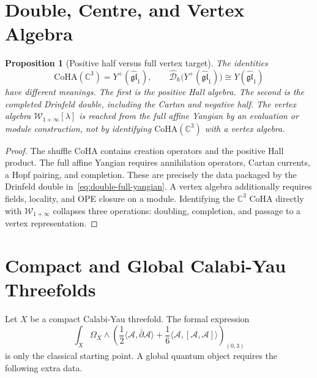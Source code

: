 \documentclass[11pt]{article}
\newtheorem{proposition}[theorem]{Proposition}
\theoremstyle{remark}
\providecommand{\C}{\mathbb{C}}
\providecommand{\cW}{\mathcal{W}}
\providecommand{\fgl}{\mathfrak{gl}}
\providecommand{\dbar}{\bar{\partial}}
\providecommand{\CoHA}{\mathrm{CoHA}}
\providecommand{\Yplus}{Y^+}
\providecommand{\D}{\mathcal{D}}
\begin{document}
\section{Double, Centre, and Vertex Algebra}

\begin{proposition}[Positive half versus full vertex target]
\label{prop:positive-half-not-w}
The identities
\[
  \CoHA(\C^3)=\Yplus(\widehat{\fgl}_1),
  \qquad
  \widehat{\D}_{\hbar}\bigl(\Yplus(\widehat{\fgl}_1)\bigr)
  \cong
  Y(\widehat{\fgl}_1)
  \label{eq:double-full-yangian}
\]
have different meanings.  The first is the positive Hall algebra.  The
second is the completed Drinfeld double, including the Cartan and
negative half.  The vertex algebra $\cW_{1+\infty}[\lambda]$ is reached
from the full affine Yangian by an evaluation or module construction,
not by identifying $\CoHA(\C^3)$ with a vertex algebra.
\end{proposition}

\begin{proof}
The shuffle CoHA contains creation operators and the positive Hall
product.  The full affine Yangian requires annihilation operators,
Cartan currents, a Hopf pairing, and completion.  These are precisely
the data packaged by the Drinfeld double in~\eqref{eq:double-full-yangian}.
A vertex algebra additionally requires fields, locality, and OPE
closure on a module.  Identifying the $\C^3$ CoHA directly with
$\cW_{1+\infty}$ collapses three operations: doubling, completion, and
passage to a vertex representation.
\end{proof}

\section{Compact and Global Calabi-Yau Threefolds}

Let $X$ be a compact Calabi-Yau threefold.  The formal expression
\[
  \int_X\Omega_X\wedge
  \left(
    \frac12\langle\mathcal A,\dbar\mathcal A\rangle
    +\frac16\langle\mathcal A,[\mathcal A,\mathcal A]\rangle
  \right)_{(0,3)}
\]
is only the classical starting point.  A global quantum object requires
the following extra data.
\end{document}
